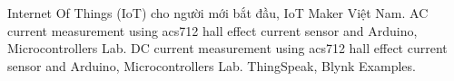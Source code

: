 %
%

    \begin{thebibliography}{9}
             Internet Of Things (IoT) cho người mới bắt đầu, IoT Maker Việt Nam.
             AC current measurement using acs712 hall effect current sensor and Arduino, Microcontrollers Lab.
             DC current measurement using acs712 hall effect current sensor and Arduino, Microcontrollers Lab.
             ThingSpeak, Blynk Examples.
    \end{thebibliography}
